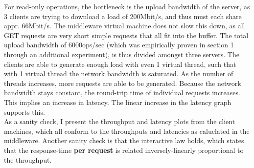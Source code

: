 \documentclass[11pt,a4paper]{article}
\begin{document}
For read-only operations, the bottleneck is the upload bandwidth of the server,
as 3 clients are trying to download a load of 200Mbit/s, and thus must each share appr. 66Mbit/s.
The middleware virtual machine does not slow this down, as all GET requests are very short simple requests that all fit into the buffer.
The total upload bandwidth of 6000ops/sec (which was empirically proven in section 1 through an additional experiment), is thus divided amongst  three servers.
The clients are able to generate enough load with even 1 virtual thread, such that with 1 virtual thread the network bandwidth is saturated.
As the number of threads increases, more requests are able to be generated.
Because the network bandwidth stays constant, the round-trip time of individual requests increases.
This implies an increase in latency.
The linear increase in the latency graph supports this. \\

As a sanity check, I present the throughput and latency plots from the client machines, which all conform to the throughputs and latencies as caluclated in the middleware.
Another sanity check is that the interactive law holds, which states that the response-time \textbf{per request}  is related inversely-linearly proportional to the throughput.
\end{document}

